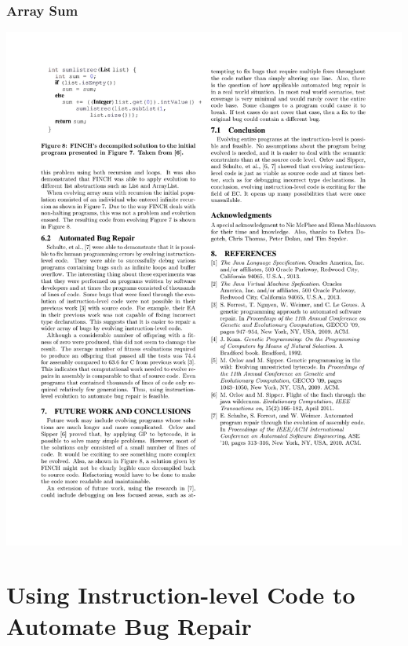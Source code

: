 \documentclass{beamer}
\begin{document}
\begin{frame}
\frametitle{Array Sum}

\includegraphics[height=.38\textheight]{Illustrations/solutionRec.pdf}

\end{frame}












\section[Evolving Assembly]{Using Instruction-level Code to Automate Bug Repair}
\end{document}
